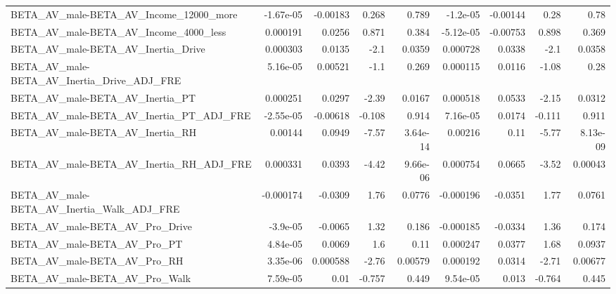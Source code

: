 \begin{tabular}{lrrrrrrrr}
BETA\_AV\_male-BETA\_AV\_Income\_12000\_more             &   -1.67e-05 &     -0.00183 &    0.268 &    0.789 &   -1.2e-05 &    -0.00144 &         0.28 &          0.78 \\
BETA\_AV\_male-BETA\_AV\_Income\_4000\_less              &    0.000191 &       0.0256 &    0.871 &    0.384 &  -5.12e-05 &    -0.00753 &        0.898 &         0.369 \\
BETA\_AV\_male-BETA\_AV\_Inertia\_Drive                 &    0.000303 &       0.0135 &     -2.1 &   0.0359 &   0.000728 &      0.0338 &         -2.1 &        0.0358 \\
BETA\_AV\_male-BETA\_AV\_Inertia\_Drive\_ADJ\_FRE         &    5.16e-05 &      0.00521 &     -1.1 &    0.269 &   0.000115 &      0.0116 &        -1.08 &          0.28 \\
BETA\_AV\_male-BETA\_AV\_Inertia\_PT                    &    0.000251 &       0.0297 &    -2.39 &   0.0167 &   0.000518 &      0.0533 &        -2.15 &        0.0312 \\
BETA\_AV\_male-BETA\_AV\_Inertia\_PT\_ADJ\_FRE            &   -2.55e-05 &     -0.00618 &   -0.108 &    0.914 &   7.16e-05 &      0.0174 &       -0.111 &         0.911 \\
BETA\_AV\_male-BETA\_AV\_Inertia\_RH                    &     0.00144 &       0.0949 &    -7.57 & 3.64e-14 &    0.00216 &        0.11 &        -5.77 &      8.13e-09 \\
BETA\_AV\_male-BETA\_AV\_Inertia\_RH\_ADJ\_FRE            &    0.000331 &       0.0393 &    -4.42 & 9.66e-06 &   0.000754 &      0.0665 &        -3.52 &       0.00043 \\
BETA\_AV\_male-BETA\_AV\_Inertia\_Walk\_ADJ\_FRE          &   -0.000174 &      -0.0309 &     1.76 &   0.0776 &  -0.000196 &     -0.0351 &         1.77 &        0.0761 \\
BETA\_AV\_male-BETA\_AV\_Pro\_Drive                     &    -3.9e-05 &      -0.0065 &     1.32 &    0.186 &  -0.000185 &     -0.0334 &         1.36 &         0.174 \\
BETA\_AV\_male-BETA\_AV\_Pro\_PT                        &    4.84e-05 &       0.0069 &      1.6 &     0.11 &   0.000247 &      0.0377 &         1.68 &        0.0937 \\
BETA\_AV\_male-BETA\_AV\_Pro\_RH                        &    3.35e-06 &     0.000588 &    -2.76 &  0.00579 &   0.000192 &      0.0314 &        -2.71 &       0.00677 \\
BETA\_AV\_male-BETA\_AV\_Pro\_Walk                      &    7.59e-05 &         0.01 &   -0.757 &    0.449 &   9.54e-05 &       0.013 &       -0.764 &         0.445 \\

\end{tabular}
